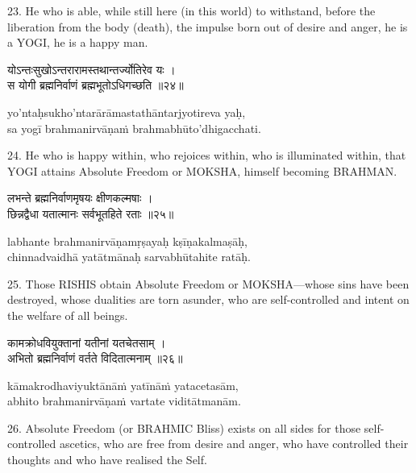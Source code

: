 23. He who is able, while still here (in this world) to withstand, before the
liberation from the body (death), the impulse born out of desire and anger, he
is a YOGI, he is a happy man.

\begin{gitaverse}
योऽन्तःसुखोऽन्तरारामस्तथान्तर्ज्योतिरेव यः । \\
स योगी ब्रह्मनिर्वाणं ब्रह्मभूतोऽधिगच्छति ॥२४॥
\end{gitaverse}

\begin{transliteration}
yo'ntaḥsukho'ntarārāmastathāntarjyotireva yaḥ, \\
sa yogī brahmanirvāṇaṁ brahmabhūto'dhigacchati.
\end{transliteration}

24. He who is happy within, who rejoices within, who is illuminated within,
that YOGI attains Absolute Freedom or MOKSHA, himself becoming BRAHMAN.\@

\begin{gitaverse}
लभन्ते ब्रह्मनिर्वाणमृषयः क्षीणकल्मषाः । \\
छिन्नद्वैधा यतात्मानः सर्वभूतहिते रताः ॥२५॥
\end{gitaverse}

\begin{transliteration}
labhante brahmanirvāṇamṛṣayaḥ kṣīṇakalmaṣāḥ, \\
chinnadvaidhā yatātmānaḥ sarvabhūtahite ratāḥ.
\end{transliteration}

25. Those RISHIS obtain Absolute Freedom or MOKSHA---whose sins have been
destroyed, whose dualities are torn asunder, who are self-controlled and intent
on the welfare of all beings.

\begin{gitaverse}
कामक्रोधवियुक्तानां यतीनां यतचेतसाम् । \\
अभितो ब्रह्मनिर्वाणं वर्तते विदितात्मनाम् ॥२६॥
\end{gitaverse}

\begin{transliteration}
kāmakrodhaviyuktānāṁ yatīnāṁ yatacetasām, \\
abhito brahmanirvāṇaṁ vartate viditātmanām.
\end{transliteration}

26. Absolute Freedom (or BRAHMIC Bliss) exists on all sides for those
self-controlled ascetics, who are free from desire and anger, who have
controlled their thoughts and who have realised the Self.

